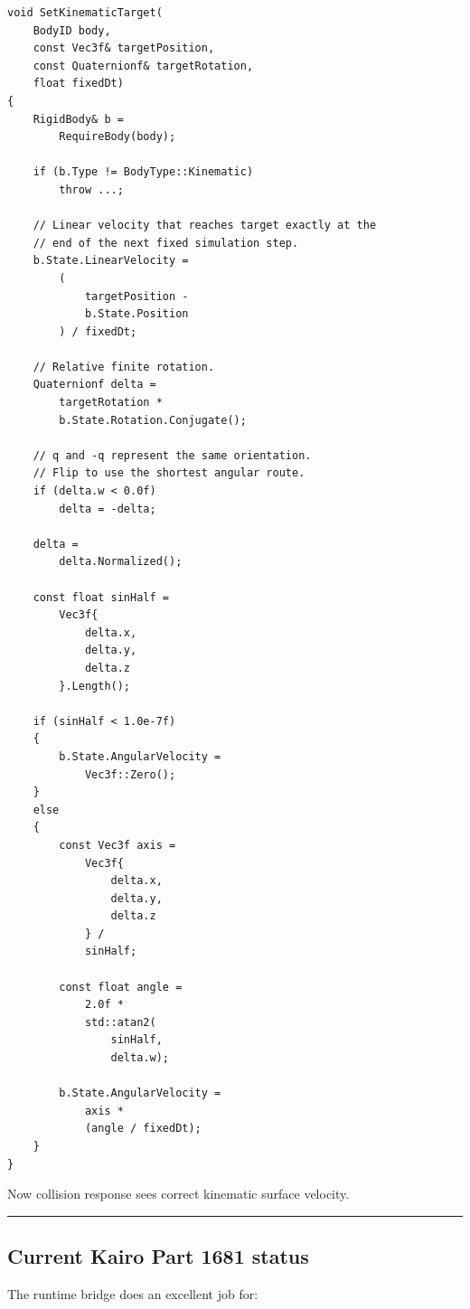 \begin{verbatim}
void SetKinematicTarget(
    BodyID body,
    const Vec3f& targetPosition,
    const Quaternionf& targetRotation,
    float fixedDt)
{
    RigidBody& b =
        RequireBody(body);

    if (b.Type != BodyType::Kinematic)
        throw ...;

    // Linear velocity that reaches target exactly at the
    // end of the next fixed simulation step.
    b.State.LinearVelocity =
        (
            targetPosition -
            b.State.Position
        ) / fixedDt;

    // Relative finite rotation.
    Quaternionf delta =
        targetRotation *
        b.State.Rotation.Conjugate();

    // q and -q represent the same orientation.
    // Flip to use the shortest angular route.
    if (delta.w < 0.0f)
        delta = -delta;

    delta =
        delta.Normalized();

    const float sinHalf =
        Vec3f{
            delta.x,
            delta.y,
            delta.z
        }.Length();

    if (sinHalf < 1.0e-7f)
    {
        b.State.AngularVelocity =
            Vec3f::Zero();
    }
    else
    {
        const Vec3f axis =
            Vec3f{
                delta.x,
                delta.y,
                delta.z
            } /
            sinHalf;

        const float angle =
            2.0f *
            std::atan2(
                sinHalf,
                delta.w);

        b.State.AngularVelocity =
            axis *
            (angle / fixedDt);
    }
}
\end{verbatim}

Now collision response sees correct kinematic surface velocity.

\begin{center}\rule{0.5\linewidth}{0.5pt}\end{center}

\subsection{Current Kairo Part 1681 status}\label{06-engine-ii-ch037-current-kairo-part-1681-status}

\hypertarget{06-engine-ii-ch037-current-kairo-part-1681-status}{}

The runtime bridge does an excellent job for:


